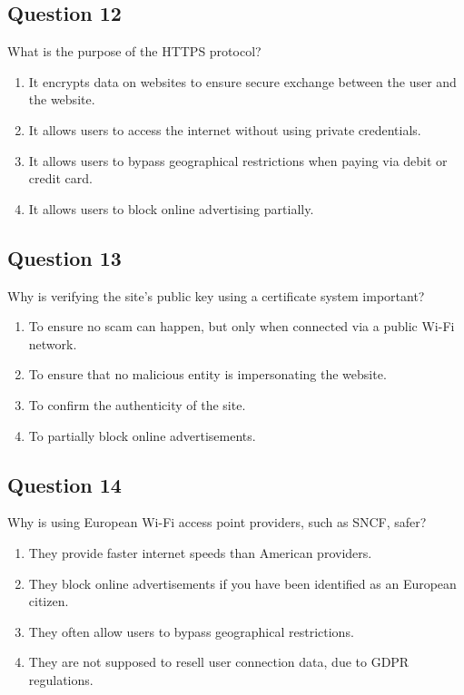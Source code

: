 \documentclass[12pt,a4paper]{article}
\begin{document}
\bigskip


\subsection*{Question 12}
What is the purpose of the HTTPS protocol?

\begin{enumerate}[label=\Alph*., leftmargin=*]
\item It encrypts data on websites to ensure secure exchange between the user and the website.
\item It allows users to access the internet without using private credentials.
\item It allows users to bypass geographical restrictions when paying via debit or credit card.
\item It allows users to block online advertising partially.
\end{enumerate}

\bigskip


\subsection*{Question 13}
Why is verifying the site's public key using a certificate system important?

\begin{enumerate}[label=\Alph*., leftmargin=*]
\item To ensure no scam can happen, but only when connected via a public Wi-Fi network.
\item To ensure that no malicious entity is impersonating the website.
\item To confirm the authenticity of the site.
\item To partially block online advertisements.
\end{enumerate}

\bigskip


\subsection*{Question 14}
Why is using European Wi-Fi access point providers, such as SNCF, safer?

\begin{enumerate}[label=\Alph*., leftmargin=*]
\item They provide faster internet speeds than American providers.
\item They block online advertisements if you have been identified as an European citizen.
\item They often allow users to bypass geographical restrictions.
\item They are not supposed to resell user connection data, due to GDPR regulations.
\end{enumerate}
\end{document}

